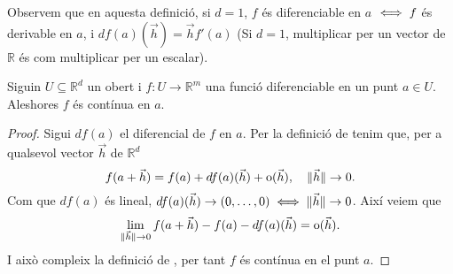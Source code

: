 \documentclass[../Apunts.tex]{subfiles}
\begin{document}
	\begin{observation}
		\label{obs:diferencial en d=1 és com derivar}
		Observem que en aquesta definició, si \(d=1\), \(f\) és diferenciable en \(a\) \(\iff f\) és derivable en \(a\), i \(df(a)(\vec{h})=\vec{h}f'(a)\) (Si \(d=1\), multiplicar per un vector de \(\mathbb{R}\) és com multiplicar per un escalar).
	\end{observation}
	\begin{proposition}
		\label{prop:Diferenciable implica contínua}
		Siguin \(U\subseteq\mathbb{R}^{d}\) un obert i \(f\colon U\to\mathbb{R}^{m}\) una funció diferenciable en un punt \(a\in U\). Aleshores \(f\) és contínua en \(a\).
		\begin{proof}
			Sigui \(df(a)\) el diferencial de \(f\) en \(a\). Per la definició de  tenim que, per a qualsevol vector \(\vec{h}\) de \(\mathbb{R}^d\)
			\[f(a+\vec{h})=f(a)+df(a)(\vec{h})+\operatorname{o}(\vec{h}),\quad \lVert\vec{h}\rVert\to0.\]
			Com que \(df(a)\) és lineal, \(df(a)(\vec{h})\to(0,\dots,0)\iff\lVert\vec{h}\rVert\to0\). Així veiem que
			\[\lim_{\lVert\vec{h}\rVert\to0}f(a+\vec{h})-f(a)-df(a)(\vec{h})=\operatorname{o}(\vec{h}).\]
			I això compleix la definició de , per tant \(f\) és contínua en el punt \(a\).
		\end{proof}
	\end{proposition}
\end{document}
